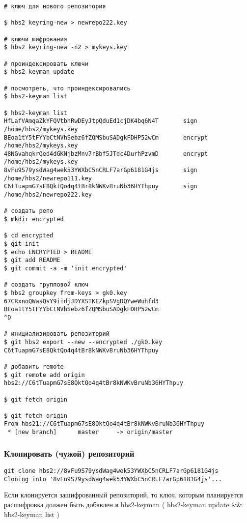 \documentclass[11pt,a4paper]{article}
\begin{document}
\begin{verbatim}
# ключ для нового репозитория

$ hbs2 keyring-new > newrepo222.key

# ключи шифрования
$ hbs2 keyring-new -n2 > mykeys.key

# проиндексировать ключи
$ hbs2-keyman update

# посмотреть, что проиндексировались
$ hbs2-keyman list

$ hbs2-keyman list
HfLafVAmqaZkYFQVtbhRwDEyJtpQduEd1cjDK4bq6N4T       sign       /home/hbs2/mykeys.key
BEoa1tY5tFYYbCtNVhSebz6fZQMSbuSADgkFDHP52wCm       encrypt    /home/hbs2/mykeys.key
48NGvahqkrQed4dGKNjbzMnv7rBbf5JTdc4DurhPzvmD       encrypt    /home/hbs2/mykeys.key
8vFu9S79ysdWag4wek53YWXbC5nCRLF7arGp6181G4js       sign       /home/hbs2/newrepo111.key
C6tTuapmG7sE8QktQo4q4tBr8kNWKvBruNb36HYThpuy       sign       /home/hbs2/newrepo222.key

# создать репо
$ mkdir encrypted

$ cd encrypted
$ git init
$ echo ENCRYPTED > README
$ git add README
$ git commit -a -m 'init encrypted'

# создать групповой ключ
$ hbs2 groupkey from-keys > gk0.key
67CRxnoQWasQsY9iidjJDYXSTKEZkpSVgDQYweWuhfd3
BEoa1tY5tFYYbCtNVhSebz6fZQMSbuSADgkFDHP52wCm
^D

# инициализировать репозиторий
$ git hbs2 export --new --encrypted ./gk0.key  C6tTuapmG7sE8QktQo4q4tBr8kNWKvBruNb36HYThpuy

# добавить remote
$ git remote add origin hbs2://C6tTuapmG7sE8QktQo4q4tBr8kNWKvBruNb36HYThpuy

$ git fetch origin

$ git fetch origin
From hbs21://C6tTuapmG7sE8QktQo4q4tBr8kNWKvBruNb36HYThpuy
 * [new branch]      master     -> origin/master

\end{verbatim}


\subsubsection{Клонировать (чужой) репозиторий}

\begin{verbatim}
git clone hbs2://8vFu9S79ysdWag4wek53YWXbC5nCRLF7arGp6181G4js
Cloning into '8vFu9S79ysdWag4wek53YWXbC5nCRLF7arGp6181G4js'...

\end{verbatim}

Если клонируется зашифрованный репозиторий, то ключ, которым планируется
расшифровка должен быть добавлен в hbs2-keyman ( hbs2-keyman update \&\& hbs2-keyman list )
\end{document}
